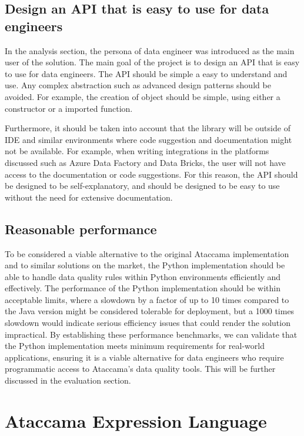 \subsection{Design an API that is easy to use for data engineers}

In the analysis section, the persona of data engineer was introduced as the main user of the solution. The main goal of the project is to design an API that is easy to use for data engineers. The API should be simple a easy to understand and use. Any complex abstraction such as advanced design patterns should be avoided. For example, the creation of object should be simple, using either a constructor or a imported function. 

Furthermore, it should be taken into account that the library will be outside of IDE and similar environments where code suggestion and documentation might not be available. For example, when writing integrations in the platforms discussed such as Azure Data Factory and Data Bricks, the user will not have access to the documentation or code suggestions. For this reason, the API should be designed to be self-explanatory, and should be designed to be easy to use without the need for extensive documentation.

\subsection{Reasonable performance}

To be considered a viable alternative to the original Ataccama implementation and to similar solutions on the market, the Python implementation should be able to handle data quality rules within Python environments efficiently and effectively. The performance of the Python implementation should be within acceptable limits, where a slowdown by a factor of up to 10 times compared to the Java version might be considered tolerable for deployment, but a 1000 times slowdown would indicate serious efficiency issues that could render the solution impractical. By establishing these performance benchmarks, we can validate that the Python implementation meets minimum requirements for real-world applications, ensuring it is a viable alternative for data engineers who require programmatic access to Ataccama's data quality tools. This will be further discussed in the evaluation section.

\section{Ataccama Expression Language}

